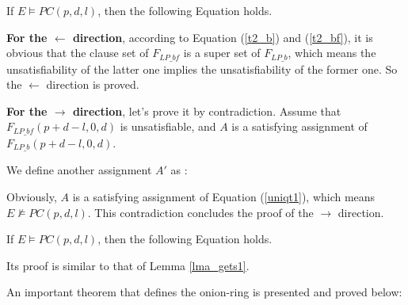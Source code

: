 \documentclass[journal]{IEEEtran}
\begin{document}
\begin{lemma}\label{lma_gets1}
If $E\vDash PC(p,d,l)$,
then the following Equation holds.
\begin{equation}\label{eq_gets1}
\end{equation}
\end{lemma}
\begin{IEEEproof}
\textbf{For the $\gets$ direction},
according to Equation (\ref{t2_b}) and (\ref{t2_bf}),
it is obvious that the clause set of $F_{LP\_bf}$ is a super set of $F_{LP\_b}$,
which means the unsatisfiability of the latter one implies the unsatisfiability of the former one.
So the $\gets$ direction is proved.

\textbf{For the $\to$ direction},
let's prove it by contradiction.
Assume that $F_{LP\_bf}(p+d-l,0,d)$ is unsatisfiable,
and $A$ is a satisfying assignment of $F_{LP\_b}(p+d-l,0,d)$.

We define another assignment $A'$ as :
\begin{equation}
\end{equation}

Obviously,
$A$ is a satisfying assignment of Equation (\ref{uniqt1}),
which means $E\nvDash PC(p,d,l)$.
This contradiction concludes the proof of the $\to$ direction.

\end{IEEEproof}

\begin{lemma}\label{lma_gets2}
If $E\vDash PC(p,d,l)$,
then the following Equation holds.
\begin{equation}\label{eq_gets2}
\end{equation}
\end{lemma}

Its proof is similar to that of Lemma \ref{lma_gets1}.

An important theorem that defines the onion-ring is presented and proved below:
\end{document}
